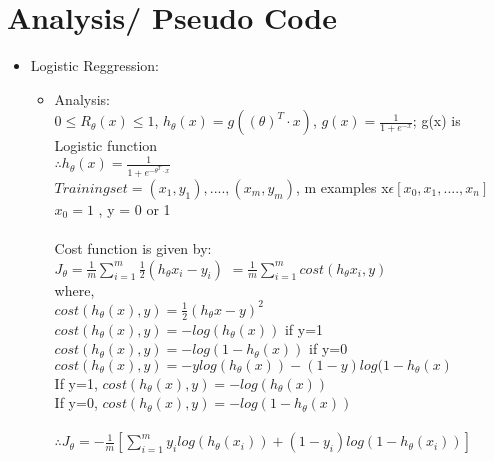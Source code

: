 \documentclass{article}
\begin{document}
\newpage
\section{Analysis/ Pseudo Code}
\begin{itemize}
    \item Logistic Reggression: 
    \begin{itemize}
        \item Analysis: 
        \\$0 \leq R_{\theta} (x) \leq 1$, \hspace{3mm}
        $h_{\theta}(x) = g((\theta)^{T} \cdot x)$, \hspace{3mm}
        $g(x) = \frac{1}{1+e^{-x}}$; \hspace{1mm} g(x) is Logistic function
        \\$\therefore h_{\theta}(x) = \frac{1}{1+e^{-\theta^{T} \cdot x}}$
        \\$Training set = {(x_{1},y_{1}),....,(x_{m},y_{m})}$, \hspace{3mm}
        m examples  x$\epsilon[x_{0},x_{1},....,x_{n}]$
        \\$x_{0} = 1$ , y = 0 or 1
        \\ \\Cost function is given by:
        \\$J_{\theta} = \frac{1}{m} \sum_{i=1}^{m} \frac{1}{2}(h_{\theta}x_{i} - y_{i})$ \hspace{1mm}
        $ = \frac{1}{m} \sum_{i=1}^{m} cost(h_{\theta}x_{i} , y)$
        \\where,
        \\$cost(h_{\theta}(x) , y) = \frac{1}{2}(h_{\theta}x - y)^{2}$
        \\$cost(h_{\theta}(x) , y) = -log(h_{\theta}(x))$ if y=1
        \\$cost(h_{\theta}(x) , y) = -log(1 - h_{\theta}(x))$ if y=0
        \\$cost(h_{\theta}(x) , y) = -y log(h_{\theta}(x)) - (1-y) log(1 - h_{\theta}(x)$
        \\If y=1, \hspace{1mm}
        $cost(h_{\theta}(x) , y) = -log(h_{\theta}(x))$
        \\If y=0, \hspace{1mm}
        $cost(h_{\theta}(x) , y) = -log(1 - h_{\theta}(x))$
        \\ \\$\therefore J_{\theta} = -\frac{1}{m} [\sum_{i=1}^{m} y_{i}
            log(h_{\theta}(x_{i})) + (1 - y_{i}) log(1 - h_{\theta} (x_{i}))]$

\end{itemize}
\end{itemize}
\end{document}
